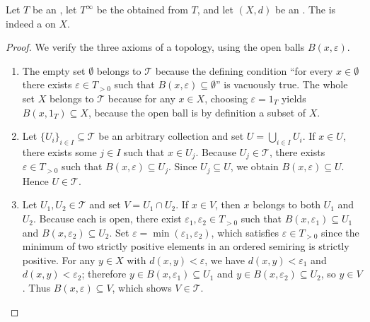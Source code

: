 \begin{proposition} \label{proposition:induced_topology_of_an_extended_metric_is_a_topology}
    Let $T$ be an , let $T^\infty$ be the  obtained from $T$, and let $(X,d)$ be an . The  is indeed a  on $X$.
\end{proposition}
\begin{proof}
    We verify the three axioms of a topology, using the open balls $B(x,\varepsilon)$.
    \begin{enumerate}
        \item The empty set $\emptyset$ belongs to $\mathcal{T}$ because the defining condition ``for every $x \in \emptyset$ there exists $\varepsilon \in T_{>0}$ such that $B(x,\varepsilon) \subseteq \emptyset$'' is vacuously true. The whole set $X$ belongs to $\mathcal{T}$ because for any $x \in X$, choosing $\varepsilon = 1_T$ yields $B(x,1_T) \subseteq X$, because the open ball is by definition a subset of $X$.

        \item Let $\{U_i\}_{i \in I} \subseteq \mathcal{T}$ be an arbitrary collection and set $U = \bigcup_{i \in I} U_i$. If $x \in U$, there exists some $j \in I$ such that $x \in U_j$. Because $U_j \in \mathcal{T}$, there exists $\varepsilon \in T_{>0}$ such that $B(x,\varepsilon) \subseteq U_j$. Since $U_j \subseteq U$, we obtain $B(x,\varepsilon) \subseteq U$. Hence $U \in \mathcal{T}$.

        \item Let $U_1, U_2 \in \mathcal{T}$ and set $V = U_1 \cap U_2$. If $x \in V$, then $x$ belongs to both $U_1$ and $U_2$. Because each is open, there exist $\varepsilon_1, \varepsilon_2 \in T_{>0}$ such that $B(x,\varepsilon_1) \subseteq U_1$ and $B(x,\varepsilon_2) \subseteq U_2$. Set $\varepsilon = \min(\varepsilon_1,\varepsilon_2)$, which satisfies $\varepsilon \in T_{>0}$ since the minimum of two strictly positive elements in an ordered semiring is strictly positive. For any $y \in X$ with $d(x,y) < \varepsilon$, we have $d(x,y) < \varepsilon_1$ and $d(x,y) < \varepsilon_2$; therefore $y \in B(x,\varepsilon_1) \subseteq U_1$ and $y \in B(x,\varepsilon_2) \subseteq U_2$, so $y \in V$. Thus $B(x,\varepsilon) \subseteq V$, which shows $V \in \mathcal{T}$.
    \end{enumerate}

\end{proof}
